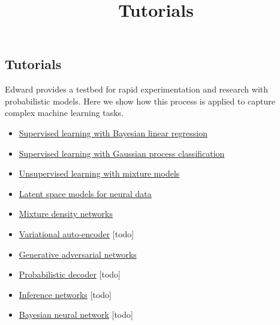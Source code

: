 \title{Tutorials}

\subsection{Tutorials}

Edward provides a testbed for rapid experimentation and research with
probabilistic models. Here we show how this process is applied to
capture complex machine learning tasks.

\begin{itemize}
  \item \href{supervised-regression}{Supervised learning with Bayesian linear regression}
  \item \href{supervised-classification}{Supervised learning with Gaussian process classification}
  \item \href{unsupervised}{Unsupervised learning with mixture models}
  \item \href{latent-space-models}{Latent space models for neural data}
  \item \href{mixture-density-network}{Mixture density networks}
  \item \href{vae}{Variational auto-encoder} [todo]
  \item \href{gan}{Generative adversarial networks}
  \item \href{decoder}{Probabilistic decoder} [todo]
  \item \href{inference-networks}{Inference networks} [todo]
  \item \href{bayesian-neural-network}{Bayesian neural network} [todo]
\end{itemize}

